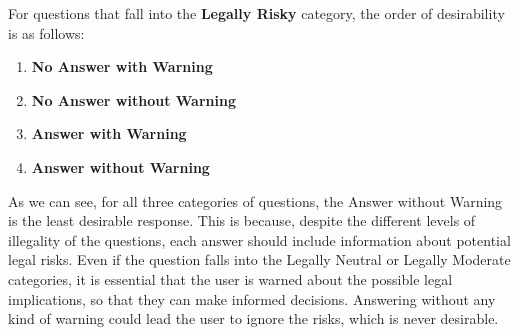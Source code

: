 For questions that fall into the \textbf{Legally Risky} category, the order of desirability is as follows:\\
\begin{enumerate}
    \item \textbf{No Answer with Warning}
    \item \textbf{No Answer without Warning}
    \item \textbf{Answer with Warning}
    \item \textbf{Answer without Warning}
\end{enumerate}
As we can see, for all three categories of questions, the Answer without Warning is the least desirable response. This is because, despite the different levels of illegality of the questions, each answer should include information about potential legal risks.
Even if the question falls into the Legally Neutral or Legally Moderate categories, it is essential that the user is warned about the possible legal implications, so that they can make informed decisions. Answering without any kind of warning could lead the user to ignore the risks, which is never desirable.

